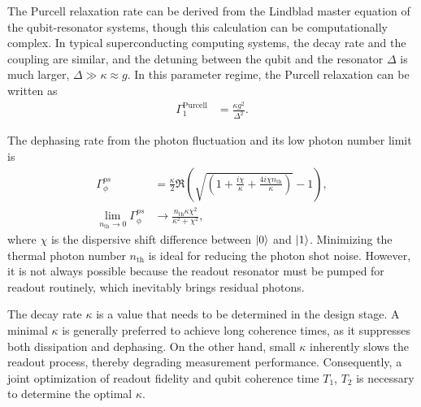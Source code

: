\documentclass[a4paper,onecolumn,11pt,unpublished]{quantumarticle}
\newcommand{\nth}{n_{\text{th}}}
\begin{document}
The Purcell relaxation rate can be derived from the Lindblad master equation of the qubit-resonator systems, though this calculation can be computationally complex. In typical superconducting computing systems, the decay rate and the coupling are similar, and the detuning between the qubit and the resonator $\Delta$ is much larger, $\Delta \gg \kappa \approx g$. In this parameter regime, the Purcell relaxation can be written as~\cite{Sete2014Purcell}
\begin{align}
  \Gamma_{1}^{\text{Purcell}} & = \frac{\kappa g^2}{\Delta^2}. \label{eq:t1_purcell}
\end{align}

The dephasing rate from the photon fluctuation and its low photon number limit is
\begin{align}
  \Gamma_{\phi}^{ps}                          & = \frac{\kappa}{2}\Re\left(\sqrt{\left(1+\frac{i\chi}{\kappa}+\frac{4i\chi \nth}{\kappa}\right)} - 1\right), \label{eq:tphi_photon_shot} \\
  \lim_{\nth\rightarrow 0} \Gamma_{\phi}^{ps} & \rightarrow \frac{\nth \kappa \chi^2}{\kappa^2 + \chi^2}, \label{eq:tphi_photon_shot_low}
\end{align}
where $\chi$ is the dispersive shift difference between $\ket{0}$ and $\ket{1}$. Minimizing the thermal photon number $\nth$ is ideal for reducing the photon shot noise. However, it is not always possible because the readout resonator must be pumped for readout routinely, which inevitably brings residual photons.

The decay rate $\kappa$ is a value that needs to be determined in the design stage. A minimal $\kappa$ is generally preferred to achieve long coherence times, as it suppresses both dissipation and dephasing. On the other hand, small $\kappa$ inherently slows the readout process, thereby degrading measurement performance. Consequently, a joint optimization of readout fidelity and qubit coherence time $T_1$, $T_2$ is necessary to determine the optimal $\kappa$.
\end{document}
